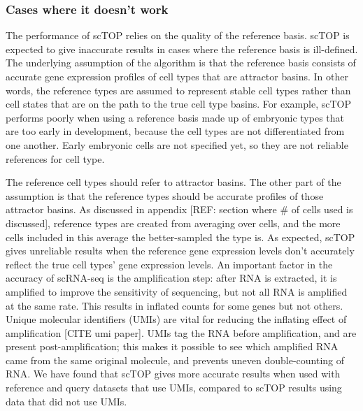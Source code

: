 \documentclass[aps,superscriptaddress, notitlepage,longbibliography]{revtex4-1}
\begin{document}
\subsubsection{Cases where it doesn't work}\label{failure_cases}
The performance of scTOP relies on the quality of the reference basis. scTOP is expected to give inaccurate results in cases where the reference basis is ill-defined. The underlying assumption of the algorithm is that the reference basis consists of accurate gene expression profiles of cell types that are attractor basins. In other words, the reference types are assumed to represent stable cell types rather than cell states that are on the path to the true cell type basins. For example, scTOP performs poorly when using a reference basis made up of embryonic types that are too early in development, because the cell types are not differentiated from one another. Early embryonic cells are not specified yet, so they are not reliable references for cell type.

The reference cell types should refer to attractor basins. The other part of the assumption is that the reference types should be accurate profiles of those attractor basins. As discussed in appendix [REF: section where \# of cells used is discussed], reference types are created from averaging over cells, and the more cells included in this average the better-sampled the type is. As expected, scTOP gives unreliable results when the reference gene expression levels don't accurately reflect the true cell types' gene expression levels. An important factor in the accuracy of scRNA-seq is the amplification step: after RNA is extracted, it is amplified to improve the sensitivity of sequencing, but not all RNA is amplified at the same rate. This results in inflated counts for some genes but not others. Unique molecular identifiers (UMIs) are vital for reducing the inflating effect of amplification [CITE umi paper]. UMIs tag the RNA before amplification, and are present post-amplification; this makes it possible to see which amplified RNA came from the same original molecule, and prevents uneven double-counting of RNA. We have found that scTOP gives more accurate results when used with reference and query datasets that use UMIs, compared to scTOP results using data that did not use UMIs.


\end{document}
